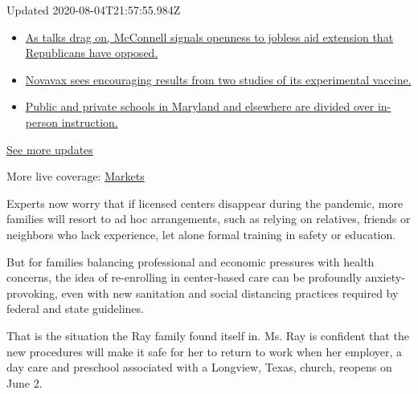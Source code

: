 Updated 2020-08-04T21:57:55.984Z

\begin{itemize}
\tightlist
\item
  \href{https://www.nytimes3xbfgragh.onion/2020/08/04/world/coronavirus-cases.html?action=click\&pgtype=Article\&state=default\&region=MAIN_CONTENT_1\&context=storylines_live_updates\#link-2daa96b5}{As
  talks drag on, McConnell signals openness to jobless aid extension
  that Republicans have opposed.}
\item
  \href{https://www.nytimes3xbfgragh.onion/2020/08/04/world/coronavirus-cases.html?action=click\&pgtype=Article\&state=default\&region=MAIN_CONTENT_1\&context=storylines_live_updates\#link-1228a480}{Novavax
  sees encouraging results from two studies of its experimental
  vaccine.}
\item
  \href{https://www.nytimes3xbfgragh.onion/2020/08/04/world/coronavirus-cases.html?action=click\&pgtype=Article\&state=default\&region=MAIN_CONTENT_1\&context=storylines_live_updates\#link-4825b93}{Public
  and private schools in Maryland and elsewhere are divided over
  in-person instruction.}
\end{itemize}

\href{https://www.nytimes3xbfgragh.onion/2020/08/04/world/coronavirus-cases.html?action=click\&pgtype=Article\&state=default\&region=MAIN_CONTENT_1\&context=storylines_live_updates}{See
more updates}

More live coverage:
\href{https://www.nytimes3xbfgragh.onion/live/2020/08/04/business/stock-market-today-coronavirus?action=click\&pgtype=Article\&state=default\&region=MAIN_CONTENT_1\&context=storylines_live_updates}{Markets}

Experts now worry that if licensed centers disappear during the
pandemic, more families will resort to ad hoc arrangements, such as
relying on relatives, friends or neighbors who lack experience, let
alone formal training in safety or education.

But for families balancing professional and economic pressures with
health concerns, the idea of re-enrolling in center-based care can be
profoundly anxiety-provoking, even with new sanitation and social
distancing practices required by federal and state guidelines.

That is the situation the Ray family found itself in. Ms. Ray is
confident that the new procedures will make it safe for her to return to
work when her employer, a day care and preschool associated with a
Longview, Texas, church, reopens on June 2.

